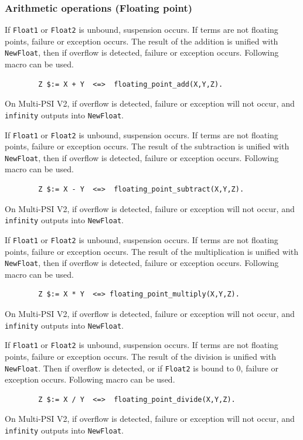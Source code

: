 \subsubsection{Arithmetic operations (Floating point)}
\begin{itemize}

If \verb|Float1| or \verb|Float2| is unbound, suspension occurs.
If terms are not floating points, failure or exception occurs.
The result of the addition is unified with \verb|NewFloat|, then
if overflow is detected, failure or exception occurs.
Following macro can be used.
\begin{verbatim}
        Z $:= X + Y  <=>  floating_point_add(X,Y,Z).
\end{verbatim}
\Caution On Multi-PSI V2, if overflow is detected, failure or exception 
will not occur, and \verb|infinity| outputs into \verb|NewFloat|.

\index{\verb|+|}
If \verb|Float1| or \verb|Float2| is unbound, suspension occurs.
If terms are not floating points, failure or exception occurs.
The result of the subtraction is unified with \verb|NewFloat|, then
if overflow is detected, failure or exception occurs.
Following macro can be used.
\begin{verbatim}
        Z $:= X - Y  <=>  floating_point_subtract(X,Y,Z).
\end{verbatim}
\Caution On Multi-PSI V2, if overflow is detected, failure or exception 
will not occur, and \verb|infinity| outputs into \verb|NewFloat|.

\index{\verb|-|}
If \verb|Float1| or \verb|Float2| is unbound, suspension occurs.
If terms are not floating points, failure or exception occurs.
The result of the multiplication is unified with \verb|NewFloat|, then
if overflow is detected, failure or exception occurs.
Following macro can be used.
\begin{verbatim}
        Z $:= X * Y  <=> floating_point_multiply(X,Y,Z).
\end{verbatim}
\Caution On Multi-PSI V2, if overflow is detected, failure or exception 
will not occur, and \verb|infinity| outputs into \verb|NewFloat|.

\index{\verb|*|}
If \verb|Float1| or \verb|Float2| is unbound, suspension occurs.
If terms are not floating points, failure or exception occurs.
The result of the division is unified with \verb|NewFloat|.
Then if overflow is detected, or if \verb|Float2| is bound to 0, 
failure or exception occurs. Following macro can be used.
\begin{verbatim}
        Z $:= X / Y  <=>  floating_point_divide(X,Y,Z).
\end{verbatim}
\Caution On Multi-PSI V2, if overflow is detected, failure or exception 
will not occur, and \verb|infinity| outputs into \verb|NewFloat|.


\end{itemize}
